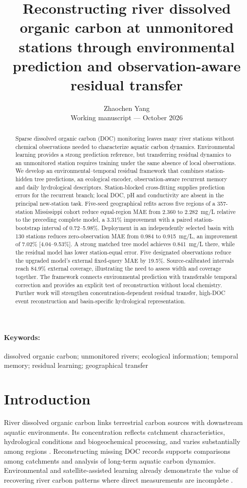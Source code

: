 \documentclass[11pt]{article}
\title{Reconstructing river dissolved organic carbon at unmonitored stations through environmental prediction and observation-aware residual transfer}
\author{Zhaochen Yang\\[2pt]\small Working manuscript --- October 2026}
\date{}
\begin{document}
\maketitle

\begin{abstract}
Sparse dissolved organic carbon (DOC) monitoring leaves many river stations without chemical observations needed to characterize aquatic carbon dynamics. Environmental learning provides a strong prediction reference, but transferring residual dynamics to an unmonitored station requires training under the same absence of local observations. We develop an environmental--temporal residual framework that combines station-hidden tree predictions, an ecological encoder, observation-aware recurrent memory and daily hydrological descriptors. Station-blocked cross-fitting supplies prediction errors for the recurrent branch; local DOC, pH and conductivity are absent in the principal new-station task. Five-seed geographical refits across five regions of a 357-station Mississippi cohort reduce equal-region MAE from 2.360 to 2.282~mg/L relative to the preceding complete model, a 3.31\% improvement with a paired station-bootstrap interval of 0.72--5.98\%. Deployment in an independently selected basin with 130 stations reduces zero-observation MAE from 0.984 to 0.915~mg/L, an improvement of 7.02\% [4.04--9.53\%]. A strong matched tree model achieves 0.841~mg/L there, while the residual model has lower station-equal error. Five designated observations reduce the upgraded model's external fixed-query MAE by 19.5\%. Source-calibrated intervals reach 84.9\% external coverage, illustrating the need to assess width and coverage together. The framework connects environmental prediction with transferable temporal correction and provides an explicit test of reconstruction without local chemistry. Further work will strengthen concentration-dependent residual transfer, high-DOC event reconstruction and basin-specific hydrological representation.
\end{abstract}
\paragraph{Keywords:} dissolved organic carbon; unmonitored rivers; ecological information; temporal memory; residual learning; geographical transfer

\section{Introduction}
River dissolved organic carbon links terrestrial carbon sources with downstream aquatic environments. Its concentration reflects catchment characteristics, hydrological conditions and biogeochemical processing, and varies substantially among regions \citep{yang2017}. Reconstructing missing DOC records supports comparisons among catchments and analysis of long-term aquatic carbon dynamics. Environmental and satellite-assisted learning already demonstrate the value of recovering river carbon patterns where direct measurements are incomplete \citep{tian2025}.
\end{document}
